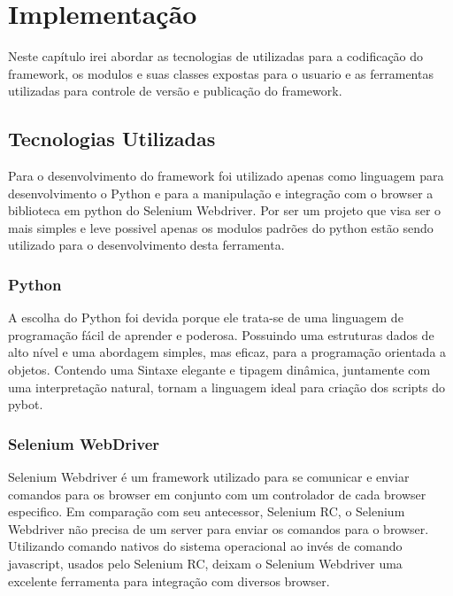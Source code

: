 %
%

\chapter{Implementação}

    Neste capítulo irei abordar as tecnologias de utilizadas para a codificação do framework,
    os modulos e suas classes expostas para o usuario e as ferramentas utilizadas para controle de versão
    e publicação do framework.


\section{Tecnologias Utilizadas}

    Para o desenvolvimento do framework foi utilizado apenas como linguagem para desenvolvimento o Python
    e para a manipulação e integração com o browser a biblioteca em python do Selenium Webdriver. Por ser um
    projeto que visa ser o mais simples e leve possivel apenas os modulos padrões do python estão sendo utilizado
    para o desenvolvimento desta ferramenta.


    \subsection{Python}

        A escolha do Python \cite{python} foi devida porque ele trata-se de uma linguagem de programação fácil de aprender e poderosa.
        Possuindo uma estruturas dados de alto nível e uma abordagem simples, mas eficaz, para a programação orientada
        a objetos. Contendo uma Sintaxe elegante e tipagem dinâmica, juntamente com uma interpretação natural, tornam
        a linguagem ideal para criação dos scripts do pybot.

    \subsection{Selenium WebDriver}
        Selenium Webdriver \cite{webdriver} é um framework utilizado para se comunicar e enviar comandos para os browser
        em conjunto com um controlador de cada browser especifico. Em comparação com seu antecessor, Selenium RC, o Selenium Webdriver
        não precisa de um server para enviar os comandos para o browser. Utilizando comando nativos do sistema operacional ao invés de
        comando javascript, usados pelo Selenium RC, deixam o Selenium Webdriver uma excelente ferramenta para integração com diversos
        browser.

